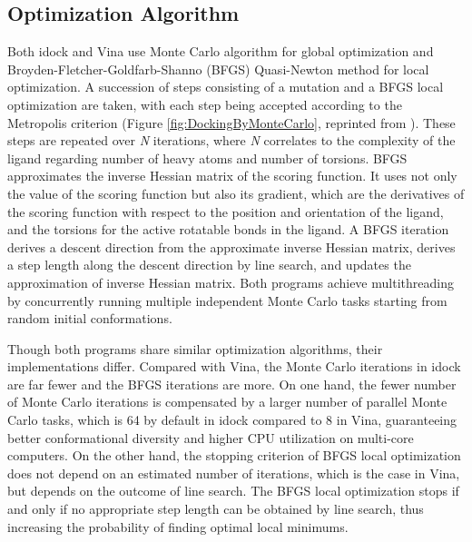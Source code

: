 \documentclass[10pt, conference, compsocconf]{../IEEEtran}
\begin{document}
\subsection{Optimization Algorithm}

Both idock and Vina use Monte Carlo algorithm for global optimization and Broyden-Fletcher-Goldfarb-Shanno (BFGS) \cite{786} Quasi-Newton method for local optimization. A succession of steps consisting of a mutation and a BFGS local optimization are taken, with each step being accepted according to the Metropolis criterion (Figure \ref{fig:DockingByMonteCarlo}, reprinted from \cite{493}). These steps are repeated over \textit{N} iterations, where \textit{N} correlates to the complexity of the ligand regarding number of heavy atoms and number of torsions. BFGS approximates the inverse Hessian matrix of the scoring function. It uses not only the value of the scoring function but also its gradient, which are the derivatives of the scoring function with respect to the position and orientation of the ligand, and the torsions for the active rotatable bonds in the ligand. A BFGS iteration derives a descent direction from the approximate inverse Hessian matrix, derives a step length along the descent direction by line search, and updates the approximation of inverse Hessian matrix. Both programs achieve multithreading by concurrently running multiple independent Monte Carlo tasks starting from random initial conformations.


Though both programs share similar optimization algorithms, their implementations differ. Compared with Vina, the Monte Carlo iterations in idock are far fewer and the BFGS iterations are more. On one hand, the fewer number of Monte Carlo iterations is compensated by a larger number of parallel Monte Carlo tasks, which is 64 by default in idock compared to 8 in Vina, guaranteeing better conformational diversity and higher CPU utilization on multi-core computers. On the other hand, the stopping criterion of BFGS local optimization does not depend on an estimated number of iterations, which is the case in Vina, but depends on the outcome of line search. The BFGS local optimization stops if and only if no appropriate step length can be obtained by line search, thus increasing the probability of finding optimal local minimums.
\end{document}
